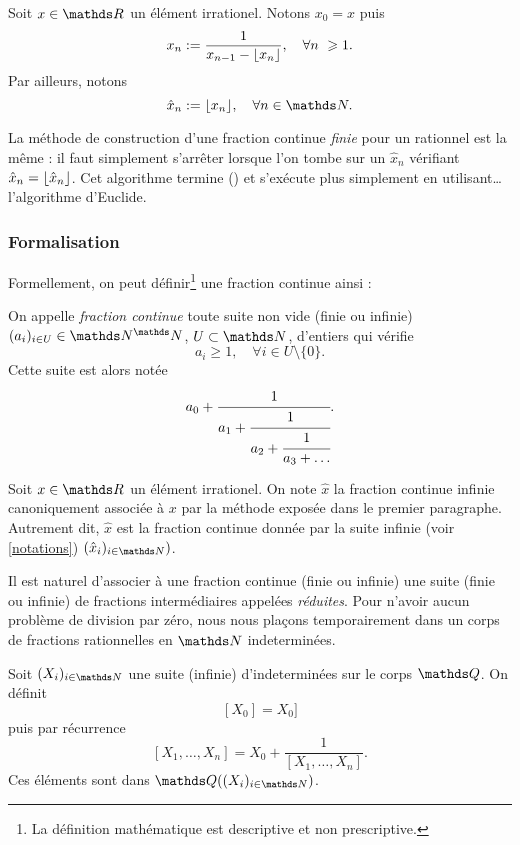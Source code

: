\begin{notation}\label{notations}
	Soit $x\in \R$ un élément irrationel. Notons $x_0 = x$ puis \[x_n :=
	\frac{1}{x_{n-1} - \ent{x_n}}, \quad \forall n \geq 1.\] Par ailleurs,
	notons \[\hat{x}_n := \ent{x_n}, \quad \forall n\in \N.\]
\end{notation}

\begin{remarque}
	La méthode de construction d'une fraction continue \emph{finie} pour un
	rationnel est la même : il faut simplement s'arrêter lorsque l'on tombe sur
	un $\hat{x}_n$ vérifiant $\hat{x}_n = \lfloor\hat{x}_n\rfloor$. Cet algorithme
	termine () et s'exécute plus simplement en utilisant… l'algorithme
	d'Euclide.
\end{remarque}

\subsubsection{Formalisation}

Formellement, on peut définir\footnote{La définition mathématique est
descriptive et non prescriptive.} une fraction continue ainsi :

\begin{definition}\label{def-fracont}
	On appelle \emph{fraction continue} toute suite non vide (finie ou infinie)
	$(a_i)_{i\in U} \in \N^\N$, $U\subset \N$, d'entiers qui vérifie \[a_i
	\geq 1, \quad \forall i\in U\setminus\{0\}.\] Cette suite est alors notée
	\[a_0 + \cfrac{1}{a_1 + \cfrac{1}{a_2 + \cfrac{1}{a_3 + \dots}}}.\]
\end{definition}

\begin{notation}
	Soit $x\in \R$ un élément irrationel. On note $\hat{x}$ la fraction
	continue infinie canoniquement associée à $x$ par la méthode exposée dans
	le premier paragraphe. Autrement dit, $\hat{x}$ est la fraction continue
	donnée par la suite infinie (voir \ref{notations}) $(\hat{x}_i)_{i\in
	\N})$.
\end{notation}

Il est naturel d'associer à une fraction continue (finie ou infinie) une suite
(finie ou infinie) de fractions \og intermédiaires \fg{} appelées
\emph{réduites}. Pour n'avoir aucun problème de division par zéro, nous nous
plaçons temporairement dans un corps de fractions rationnelles en $\N$
indeterminées.

\begin{definition}
	Soit $(X_i)_{i\in \N}$ une suite (infinie) d'indeterminées sur le corps
	$\Q$. On définit \[[X_0] = X_0]\] puis par récurrence \[[X_1, \dots,
	X_n] = X_0 + \frac{1}{[X_1, \dots, X_n]}.\] Ces éléments sont dans
	$\Q((X_i)_{i\in \N})$.
\end{definition}

